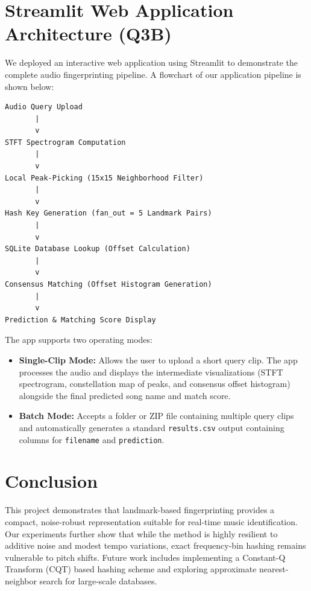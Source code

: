 \documentclass[11pt,a4paper]{article}
\begin{document}
\section{Streamlit Web Application Architecture (Q3B)}
We deployed an interactive web application using Streamlit to demonstrate the complete audio fingerprinting pipeline. A flowchart of our application pipeline is shown below:

\begin{verbatim}
Audio Query Upload
       |
       v
STFT Spectrogram Computation
       |
       v
Local Peak-Picking (15x15 Neighborhood Filter)
       |
       v
Hash Key Generation (fan_out = 5 Landmark Pairs)
       |
       v
SQLite Database Lookup (Offset Calculation)
       |
       v
Consensus Matching (Offset Histogram Generation)
       |
       v
Prediction & Matching Score Display
\end{verbatim}

The app supports two operating modes:
\begin{itemize}
    \item \textbf{Single-Clip Mode:} Allows the user to upload a short query clip. The app processes the audio and displays the intermediate visualizations (STFT spectrogram, constellation map of peaks, and consensus offset histogram) alongside the final predicted song name and match score.
    \item \textbf{Batch Mode:} Accepts a folder or ZIP file containing multiple query clips and automatically generates a standard \texttt{results.csv} output containing columns for \texttt{filename} and \texttt{prediction}.
\end{itemize}

\section{Conclusion}
This project demonstrates that landmark-based fingerprinting provides a compact, noise-robust representation suitable for real-time music identification. Our experiments further show that while the method is highly resilient to additive noise and modest tempo variations, exact frequency-bin hashing remains vulnerable to pitch shifts. Future work includes implementing a Constant-Q Transform (CQT) based hashing scheme and exploring approximate nearest-neighbor search for large-scale databases.
\end{document}
